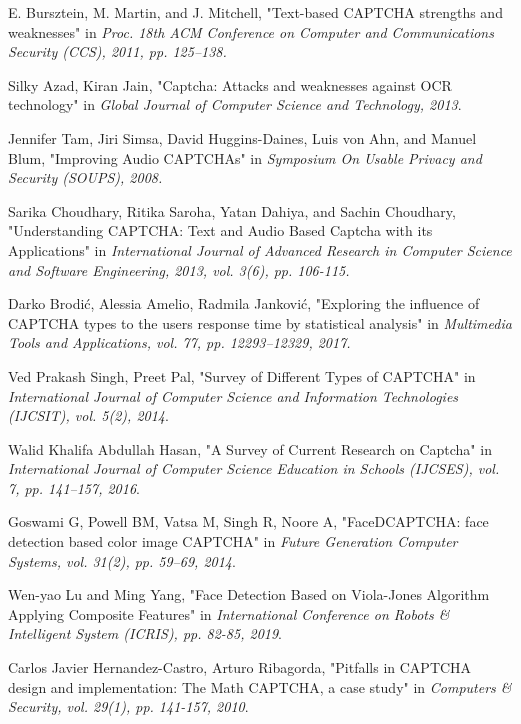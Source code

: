 \begin{thebibliography}{9}
 E. Bursztein, M. Martin, and J. Mitchell, "Text-based CAPTCHA strengths and weaknesses" in \emph{Proc. 18th ACM Conference on Computer and Communications Security (CCS), 2011, pp. 125–138.}

 Silky Azad, Kiran Jain, "Captcha: Attacks and weaknesses against OCR technology" in \emph{Global Journal of Computer Science and Technology, 2013}.

 Jennifer Tam, Jiri Simsa, David Huggins-Daines, Luis von Ahn, and Manuel Blum, "Improving Audio CAPTCHAs" in \emph{Symposium On Usable Privacy and Security (SOUPS), 2008.}

 Sarika Choudhary, Ritika Saroha, Yatan Dahiya, and Sachin Choudhary, "Understanding CAPTCHA: Text and Audio Based Captcha with its Applications" in \emph{International Journal of Advanced Research in Computer Science and Software Engineering, 2013, vol. 3(6), pp. 106-115.}

 Darko Brodi\'c, Alessia Amelio, Radmila Jankovi\'c, "Exploring the influence of CAPTCHA types to the users response time by statistical analysis" in \emph{Multimedia Tools and Applications, vol. 77, pp. 12293–12329, 2017.}

 Ved Prakash Singh, Preet Pal, "Survey of Different Types of CAPTCHA" in \emph{International Journal of Computer Science and Information Technologies (IJCSIT), vol. 5(2), 2014}.

 Walid Khalifa Abdullah Hasan, "A Survey of Current Research on Captcha" in \emph{International Journal of Computer Science Education in Schools (IJCSES), vol. 7, pp. 141–157, 2016}.

 Goswami G, Powell BM, Vatsa M, Singh R, Noore A, "FaceDCAPTCHA: face detection based color image CAPTCHA" in \emph{Future Generation Computer Systems, vol. 31(2), pp. 59–69, 2014}.

 Wen-yao Lu and Ming Yang, "Face Detection Based on Viola-Jones Algorithm Applying Composite Features" in \emph{International Conference on Robots \& Intelligent System (ICRIS), pp. 82-85, 2019}.

 Carlos Javier Hernandez-Castro, Arturo Ribagorda, "Pitfalls in CAPTCHA design and implementation: The Math CAPTCHA, a case study" in \emph{Computers \& Security, vol. 29(1), pp. 141-157, 2010}.


\end{thebibliography}
